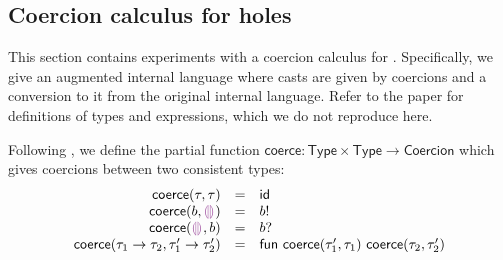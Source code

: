 \documentclass[index.tex]{subfiles}
\begin{document}
\newcommand{\coerce}{\ensuremath{\textsf{coerce}}}
\newcommand{\coerces}[2]{#1 \rightsquigarrow #2}
\newcommand{\ctxCoercesType}[4]{\ensuremath{\ctxAssignType{#1}{#2}{\coerces{#3}{#4}}}}

\newcommand{\TMName}{\textsf{Type}}
\newcommand{\TMV}{\ensuremath{\tau}}
\newcommand{\TBase}{\ensuremath{b}}
\newcommand{\THole}{\ensuremath{\SyEHole{}{}}}
\newcommand{\TArrow}[2]{\ensuremath{#1 \to #2}}

\newcommand{\CMName}{\textsf{Coercion}}
\newcommand{\CMV}{\ensuremath{c}}

\newcommand{\CId}{\ensuremath{\textsf{id}}}
\newcommand{\CFail}{\ensuremath{\textsf{fail}}}
\newcommand{\CEmb}[1]{\ensuremath{#1!}}
\newcommand{\CProj}[1]{\ensuremath{#1?}}
\newcommand{\CFun}[2]{\ensuremath{\textsf{fun} ~#1 ~#2}}
\newcommand{\CCompose}[2]{\ensuremath{#1; #2}}

\newcommand{\DTMName}{\textsf{Dynamic Tag}}
\newcommand{\DTMV}{\ensuremath{g}}
\newcommand{\DTBase}{\ensuremath{\TBase}}
\newcommand{\DTFun}{\ensuremath{\textsf{fun}}}

\newcommand{\IEMName}{\textsf{Internal Expression}}
\newcommand{\IEMV}{\ensuremath{d}}
\newcommand{\IECast}[2]{\ensuremath{#1 \langle #2 \rangle}}

\subsection{Coercion calculus for holes}
\label{sec:coercion}
This section contains experiments with a coercion calculus \cite{herman2010} for \Hazelnut{}.
Specifically, we give an augmented internal language where casts are given by coercions and a
conversion to it from the original internal language. Refer to the \HazelnutLive{} paper
\cite{omar2019} for definitions of types and expressions, which we do not reproduce here.

Following \textcite{herman2010}, we define the partial function $\coerce : \TMName \times \TMName
\to \CMName$ which gives coercions between two consistent types:
%
\newcommand{\coerceRowIs}[3]{\ensuremath{\coerce(#1, #2) &=& #3}}
\[\begin{array}{rcl}
  \coerceRowIs{\TMV}{\TMV}{\CId} \\
  \coerceRowIs{\TBase}{\THole}{\CEmb{\DTBase}} \\
  \coerceRowIs{\THole}{\TBase}{\CProj{\DTBase}} \\
  \coerceRowIs{\TArrow{\TMV_1}{\TMV_2}}{\TArrow{\TMV_1'}{\TMV_2'}}{\CFun{\coerce(\TMV_1', \TMV_1)}{\coerce(\TMV_2, \TMV_2')}} \\
\end{array}\]
\end{document}
